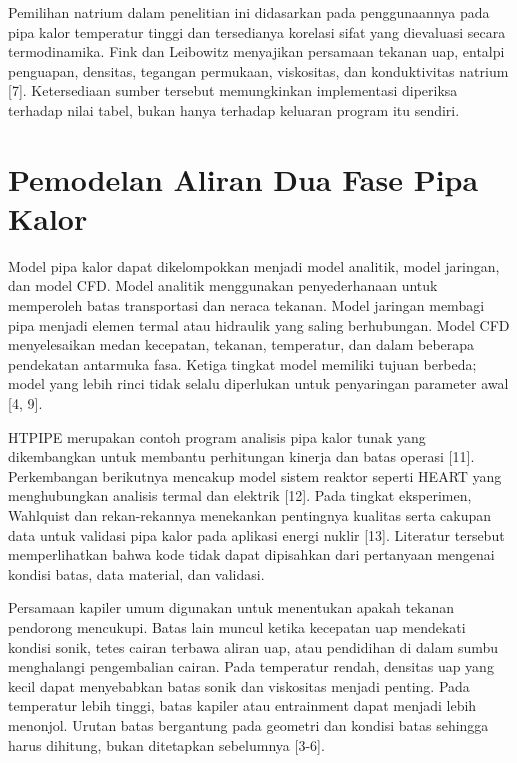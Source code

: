 \documentclass[
  12pt,a4paper,oneside]{report}
\begin{document}
Pemilihan natrium dalam penelitian ini didasarkan pada penggunaannya
pada pipa kalor temperatur tinggi dan tersedianya korelasi sifat yang
dievaluasi secara termodinamika. Fink dan Leibowitz menyajikan persamaan
tekanan uap, entalpi penguapan, densitas, tegangan permukaan,
viskositas, dan konduktivitas natrium {[}7{]}. Ketersediaan sumber
tersebut memungkinkan implementasi diperiksa terhadap nilai tabel, bukan
hanya terhadap keluaran program itu sendiri.

\hypertarget{pemodelan-aliran-dua-fase-pipa-kalor}{%
\section{Pemodelan Aliran Dua Fase Pipa
Kalor}\label{pemodelan-aliran-dua-fase-pipa-kalor}}

Model pipa kalor dapat dikelompokkan menjadi model analitik, model
jaringan, dan model CFD. Model analitik menggunakan penyederhanaan untuk
memperoleh batas transportasi dan neraca tekanan. Model jaringan membagi
pipa menjadi elemen termal atau hidraulik yang saling berhubungan. Model
CFD menyelesaikan medan kecepatan, tekanan, temperatur, dan dalam
beberapa pendekatan antarmuka fasa. Ketiga tingkat model memiliki tujuan
berbeda; model yang lebih rinci tidak selalu diperlukan untuk
penyaringan parameter awal {[}4, 9{]}.

HTPIPE merupakan contoh program analisis pipa kalor tunak yang
dikembangkan untuk membantu perhitungan kinerja dan batas operasi
{[}11{]}. Perkembangan berikutnya mencakup model sistem reaktor seperti
HEART yang menghubungkan analisis termal dan elektrik {[}12{]}. Pada
tingkat eksperimen, Wahlquist dan rekan-rekannya menekankan pentingnya
kualitas serta cakupan data untuk validasi pipa kalor pada aplikasi
energi nuklir {[}13{]}. Literatur tersebut memperlihatkan bahwa kode
tidak dapat dipisahkan dari pertanyaan mengenai kondisi batas, data
material, dan validasi.

Persamaan kapiler umum digunakan untuk menentukan apakah tekanan
pendorong mencukupi. Batas lain muncul ketika kecepatan uap mendekati
kondisi sonik, tetes cairan terbawa aliran uap, atau pendidihan di dalam
sumbu menghalangi pengembalian cairan. Pada temperatur rendah, densitas
uap yang kecil dapat menyebabkan batas sonik dan viskositas menjadi
penting. Pada temperatur lebih tinggi, batas kapiler atau entrainment
dapat menjadi lebih menonjol. Urutan batas bergantung pada geometri dan
kondisi batas sehingga harus dihitung, bukan ditetapkan sebelumnya
{[}3-6{]}.
\end{document}
